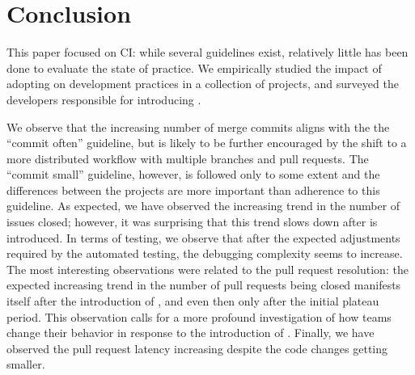 
\section{Conclusion}
\label{sec:conc}

This paper focused on CI: while several guidelines exist, relatively little 
has been done to evaluate the state of practice.
We empirically studied the impact of adopting \Tvis on development practices 
in a collection of \GH projects, and surveyed the developers responsible for 
introducing \Tvi. %

We observe that the increasing number of merge commits aligns with the the ``commit often'' guideline, but is likely to be further encouraged by the shift to a more distributed workflow with multiple branches and pull requests.
The ``commit small'' guideline, however, is followed only to some extent and the differences between the projects are more important than adherence to this guideline.
As expected, we have observed the increasing trend in the number of issues closed; however, it was surprising that this trend slows down after \Tvis is introduced.
In terms of testing, we observe that after the expected adjustments required by the automated testing, the debugging complexity seems to increase. 
The most interesting observations were related to the pull request resolution: the expected increasing trend in the number of pull requests being closed manifests itself after the introduction of \Tvis, and even then only after the initial plateau period. 
This observation calls for a more profound investigation of how \GH teams change their behavior in response to the introduction of \Tvis. 
Finally, we have observed the pull request latency increasing  despite the code changes getting smaller.

